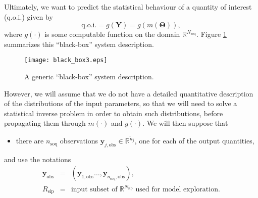 Ultimately, we want to predict the statistical behaviour of a quantity of interest (q.o.i.) given by
\begin{equation}\label{eq-qoi}
\text{q.o.i.} = g(\mathbf{Y}) = g(m(\boldsymbol{\Theta})),
\end{equation}
where $g(\cdot)$ is some computable function on the domain $\mathbb{R}^{N_{\text{soq}}}$.
Figure \ref{fig-black-box} summarizes this ``black-box'' system description.

\begin{figure}%
\begin{center}
\texttt{[image: black\_box3.eps]}
\end{center}
\caption{A generic ``black-box'' system description.
}
\label{fig-black-box}
\end{figure}

However, we will assume that we do not have a detailed quantitative description of the distributions of the input parameters, so that we will need to solve a statistical inverse problem
in order to obtain such distributions, before propagating them through $m(\cdot)$ and $g(\cdot)$.
We will then suppose that
\begin{itemize}
\item there are $n_{\text{soq}}$ observations $\mathbf{y}_{j,\text{obs}}\in\mathbb{R}^{{\tilde{n}}_j}$, one for each of the output quantities,
\end{itemize}
and use the notations
\begin{eqnarray*}
\mathbf{y}_{\text{obs}} & = & (\mathbf{y}_{1,\text{obs}}\ldots,\mathbf{y}_{n_{\text{soq}},\text{obs}}), \\
R_{\text{sip}}          & = & \text{input subset of }\mathbb{R}^{N_{\text{sip}}}\text{ used for model exploration}.
\end{eqnarray*}

